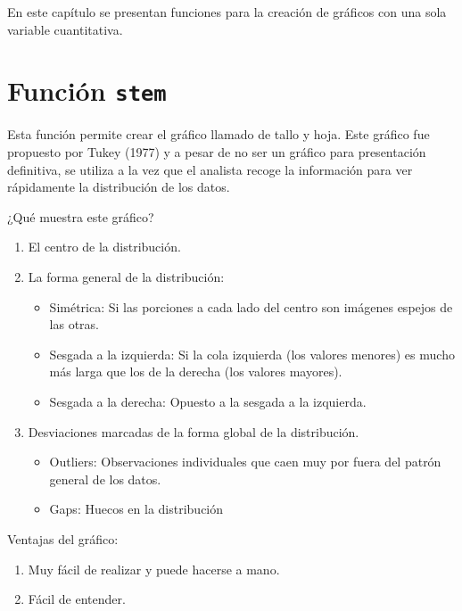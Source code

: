 \documentclass[10pt,]{krantz}
\providecommand{\tightlist}{%
  \setlength{\itemsep}{0pt}\setlength{\parskip}{0pt}}
\begin{document}
En este capítulo se presentan funciones para la creación de gráficos con
una sola variable cuantitativa.

\section{\texorpdfstring{Función \texttt{stem} 
}{Función stem  }}\label{funcion-stem}

Esta función permite crear el gráfico llamado de tallo y hoja. Este
gráfico fue propuesto por Tukey (1977) y a pesar de no ser un gráfico
para presentación definitiva, se utiliza a la vez que el analista recoge
la información para ver rápidamente la distribución de los datos.

¿Qué muestra este gráfico?

\begin{enumerate}
\def\labelenumi{\arabic{enumi}.}
\tightlist
\item
  El centro de la distribución.
\item
  La forma general de la distribución:

  \begin{itemize}
  \tightlist
  \item
    Simétrica: Si las porciones a cada lado del centro son imágenes
    espejos de las otras.
  \item
    Sesgada a la izquierda: Si la cola izquierda (los valores menores)
    es mucho más larga que los de la derecha (los valores mayores).
  \item
    Sesgada a la derecha: Opuesto a la sesgada a la izquierda.
  \end{itemize}
\item
  Desviaciones marcadas de la forma global de la distribución.

  \begin{itemize}
  \tightlist
  \item
    Outliers: Observaciones individuales que caen muy por fuera del
    patrón general de los datos.
  \item
    Gaps: Huecos en la distribución
  \end{itemize}
\end{enumerate}

Ventajas del gráfico:

\begin{enumerate}
\def\labelenumi{\arabic{enumi}.}
\tightlist
\item
  Muy fácil de realizar y puede hacerse a mano.
\item
  Fácil de entender.
\end{enumerate}
\end{document}
